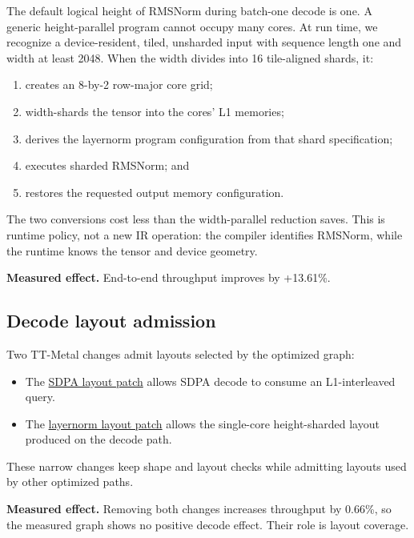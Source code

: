 \documentclass[
  10pt,
  american,
  10pt,
  letterpaper]{article}
\providecommand{\tightlist}{%
  \setlength{\itemsep}{0pt}\setlength{\parskip}{0pt}}
\begin{document}
The default logical height of RMSNorm during batch-one decode is one. A
generic height-parallel program cannot occupy many cores. At run time,
we recognize a device-resident, tiled, unsharded input with sequence
length one and width at least 2048. When the width divides into 16
tile-aligned shards, it:

\begin{enumerate}
\def\labelenumi{\arabic{enumi}.}
\tightlist
\item
  creates an 8-by-2 row-major core grid;
\item
  width-shards the tensor into the cores' L1 memories;
\item
  derives the layernorm program configuration from that shard
  specification;
\item
  executes sharded RMSNorm; and
\item
  restores the requested output memory configuration.
\end{enumerate}

The two conversions cost less than the width-parallel reduction saves.
This is runtime policy, not a new IR operation: the compiler identifies
RMSNorm, while the runtime knows the tensor and device geometry.

\textbf{Measured effect.} End-to-end throughput improves by +13.61\%.

\hypertarget{decode-layout-admission}{%
\subsection{Decode layout admission}\label{decode-layout-admission}}

Two TT-Metal changes admit layouts selected by the optimized graph:

\begin{itemize}
\tightlist
\item
  The
  \href{../../third_party/tt_metal/sdpa_decode_allow_l1_interleaved_q.patch}{SDPA
  layout patch} allows SDPA decode to consume an L1-interleaved query.
\item
  The
  \href{../../third_party/tt_metal/layernorm_allow_single_core_height_sharded.patch}{layernorm
  layout patch} allows the single-core height-sharded layout produced on
  the decode path.
\end{itemize}

These narrow changes keep shape and layout checks while admitting
layouts used by other optimized paths.

\textbf{Measured effect.} Removing both changes increases throughput by
0.66\%, so the measured graph shows no positive decode effect. Their
role is layout coverage.
\end{document}
